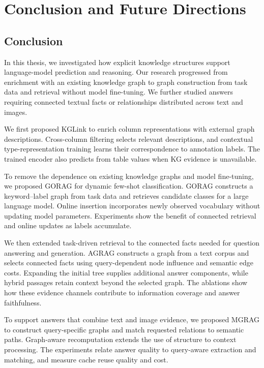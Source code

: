 \chapter{Conclusion and Future Directions}
\label{ch:conclusion}

\section{Conclusion}
\label{sec:conclusion:findings}
In this thesis, we investigated how explicit knowledge structures support language-model prediction and reasoning. Our research progressed from enrichment with an existing knowledge graph to graph construction from task data and retrieval without model fine-tuning. We further studied answers requiring connected textual facts or relationships distributed across text and images.

We first proposed KGLink to enrich column representations with external graph descriptions. Cross-column filtering selects relevant descriptions, and contextual type-representation training learns their correspondence to annotation labels. The trained encoder also predicts from table values when KG evidence is unavailable.

To remove the dependence on existing knowledge graphs and model fine-tuning, we proposed GORAG for dynamic few-shot classification. GORAG constructs a keyword--label graph from task data and retrieves candidate classes for a large language model. Online insertion incorporates newly observed vocabulary without updating model parameters. Experiments show the benefit of connected retrieval and online updates as labels accumulate.

We then extended task-driven retrieval to the connected facts needed for question answering and generation. AGRAG constructs a graph from a text corpus and selects connected facts using query-dependent node influence and semantic edge costs. Expanding the initial tree supplies additional answer components, while hybrid passages retain context beyond the selected graph. The ablations show how these evidence channels contribute to information coverage and answer faithfulness.

To support answers that combine text and image evidence, we proposed MGRAG to construct query-specific graphs and match requested relations to semantic paths. Graph-aware recomputation extends the use of structure to context processing. The experiments relate answer quality to query-aware extraction and matching, and measure cache reuse quality and cost.

